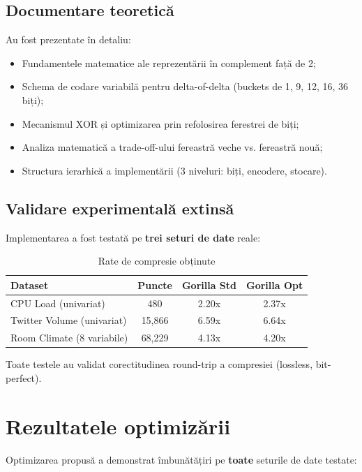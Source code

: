 \subsection{Documentare teoretică}

Au fost prezentate în detaliu:
\begin{itemize}
    \item Fundamentele matematice ale reprezentării în complement față de 2;
    \item Schema de codare variabilă pentru delta-of-delta (buckets de 1, 9, 12, 16, 36 biți);
    \item Mecanismul XOR și optimizarea prin refolosirea ferestrei de biți;
    \item Analiza matematică a trade-off-ului fereastră veche vs. fereastră nouă;
    \item Structura ierarhică a implementării (3 niveluri: biți, encodere, stocare).
\end{itemize}

\subsection{Validare experimentală extinsă}

Implementarea a fost testată pe \textbf{trei seturi de date} reale:

\begin{table}[h]
\centering
\begin{tabular}{@{}lccc@{}}
\toprule
\textbf{Dataset} & \textbf{Puncte} & \textbf{Gorilla Std} & \textbf{Gorilla Opt} \\
\midrule
CPU Load (univariat) & 480 & 2.20x & 2.37x \\
Twitter Volume (univariat) & 15,866 & 6.59x & 6.64x \\
Room Climate (8 variabile) & 68,229 & 4.13x & 4.20x \\
\bottomrule
\end{tabular}
\caption{Rate de compresie obținute}
\end{table}

Toate testele au validat corectitudinea round-trip a compresiei (lossless, bit-perfect).

\section{Rezultatele optimizării}

Optimizarea propusă a demonstrat îmbunătățiri pe \textbf{toate} seturile de date testate:


